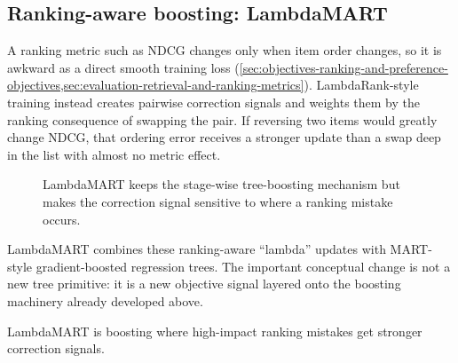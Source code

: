 \subsection{Ranking-aware boosting: LambdaMART}
\label{subsec:trees-lambdamart}
A ranking metric such as NDCG changes only when item order changes, so it is awkward as a direct smooth training loss (\cref{sec:objectives-ranking-and-preference-objectives,sec:evaluation-retrieval-and-ranking-metrics}).
LambdaRank-style training instead creates pairwise correction signals and weights them by the ranking consequence of swapping the pair.
If reversing two items would greatly change NDCG, that ordering error receives a stronger update than a swap deep in the list with almost no metric effect.

\begin{figure}[htbp]
\centering
{}
\caption{LambdaMART keeps the stage-wise tree-boosting mechanism but makes the correction signal sensitive to where a ranking mistake occurs.}
\end{figure}

LambdaMART combines these ranking-aware ``lambda'' updates with MART-style gradient-boosted regression trees.
The important conceptual change is not a new tree primitive: it is a new objective signal layered onto the boosting machinery already developed above.

\begin{calloutmemoryhook}
LambdaMART is boosting where high-impact ranking mistakes get stronger correction signals.
\end{calloutmemoryhook}

